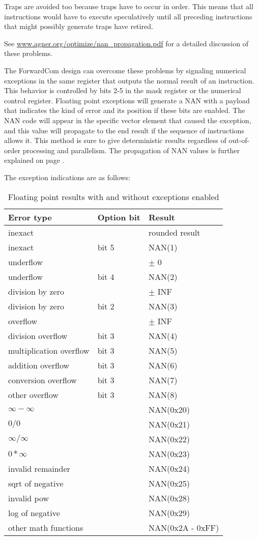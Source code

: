 \documentclass[forwardcom.tex]{subfiles}
\begin{document}
Traps are avoided too because traps have to occur in order. This means that all instructions would have to execute speculatively until all preceding instructions that might possibly generate traps have retired. 
\vv

See 
\href{https://www.agner.org/optimize/nan_propagation.pdf}{www.agner.org/optimize/nan\_propagation.pdf} for a detailed discussion of these problems.
\vv

The ForwardCom design can overcome these problems by signaling numerical exceptions in the same register that outputs the normal result of an instruction. 
This behavior is controlled by bits 2-5 in the mask register or the numerical control register. Floating point exceptions will generate a NAN with a payload that indicates the kind of error and its position if these bits are enabled. The NAN code will appear in the specific vector element that caused the exception, and this value will propagate to the end result if the sequence of instructions allows it. This method is sure to give deterministic results regardless of out-of-order processing and parallelism. The propagation of NAN values is further explained on page \pageref{nanPropagation}.
\vv

The exception indications are as follows:

\begin{longtable}
{|p{55mm}|p{20mm}|p{50mm}|}
\caption{Floating point results with and without exceptions enabled}
\label{table:FPExceptionResults}
\endfirsthead
\endhead
\hline
\bfseries Error type & \bfseries Option bit & \bfseries Result \\ \hline
inexact & & rounded result \\
inexact & bit 5 & NAN(1) \\
underflow & & $\pm$ 0 \\
underflow & bit 4 & NAN(2) \\
division by zero &  & $\pm$ INF \\
division by zero & bit 2 & NAN(3) \\
overflow & & $\pm$ INF \\
division overflow & bit 3 & NAN(4) \\
multiplication overflow & bit 3 & NAN(5) \\
addition overflow & bit 3 & NAN(6) \\
conversion overflow & bit 3 & NAN(7) \\
other overflow & bit 3 & NAN(8) \\
$\infty - \infty$ &  & NAN(0x20) \\
$0 / 0$  &  & NAN(0x21) \\
$\infty / \infty$ &  & NAN(0x22) \\ 
$0 * \infty$ &  & NAN(0x23) \\ 
invalid remainder & & NAN(0x24) \\
sqrt of negative & & NAN(0x25) \\
invalid pow & & NAN(0x28) \\
log of negative & & NAN(0x29) \\
other math functions & & NAN(0x2A - 0xFF) \\
\hline
\end{longtable}
\end{document}
